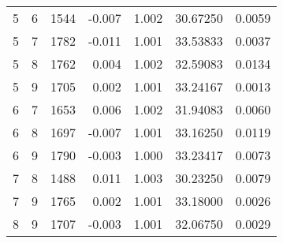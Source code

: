 \begin{longtable}{rrrrrrr}
5 & 6 & 1544 & -0.007 & 1.002 & 30.67250 & 0.0059 \\ 
5 & 7 & 1782 & -0.011 & 1.001 & 33.53833 & 0.0037 \\ 
5 & 8 & 1762 & 0.004 & 1.002 & 32.59083 & 0.0134 \\ 
5 & 9 & 1705 & 0.002 & 1.001 & 33.24167 & 0.0013 \\ 
6 & 7 & 1653 & 0.006 & 1.002 & 31.94083 & 0.0060 \\ 
6 & 8 & 1697 & -0.007 & 1.001 & 33.16250 & 0.0119 \\ 
6 & 9 & 1790 & -0.003 & 1.000 & 33.23417 & 0.0073 \\ 
7 & 8 & 1488 & 0.011 & 1.003 & 30.23250 & 0.0079 \\ 
7 & 9 & 1765 & 0.002 & 1.001 & 33.18000 & 0.0026 \\ 
8 & 9 & 1707 & -0.003 & 1.001 & 32.06750 & 0.0029 \\ 
\bottomrule
\end{longtable}


